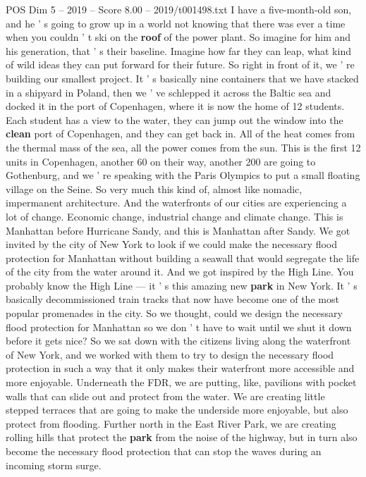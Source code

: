 \begin{textsample}{POS Dim 5 – 2019 – Score 8.00 – 2019/t001498.txt}
I have a five-month-old son, and he ' s going to grow up in a world not knowing that there was ever a time when you couldn ' t ski on the \textbf{roof} of the power plant.
So imagine for him and his generation, that ' s their baseline.
Imagine how far they can leap, what kind of wild ideas they can put forward for their future.
So right in front of it, we ' re building our smallest project.
It ' s basically nine containers that we have stacked in a shipyard in Poland, then we ' ve schlepped it across the Baltic sea and docked it in the port of Copenhagen, where it is now the home of 12 students.
Each student has a view to the water, they can jump out the window into the \textbf{clean} port of Copenhagen, and they can get back in.
All of the heat comes from the thermal mass of the sea, all the power comes from the sun.
This is the first 12 units in Copenhagen, another 60 on their way, another 200 are going to Gothenburg, and we ' re speaking with the Paris Olympics to put a small floating village on the Seine.
So very much this kind of, almost like nomadic, impermanent architecture.
And the waterfronts of our cities are experiencing a lot of change.
Economic change, industrial change and climate change.
This is Manhattan before Hurricane Sandy, and this is Manhattan after Sandy.
We got invited by the city of New York to look if we could make the necessary flood protection for Manhattan without building a seawall that would segregate the life of the city from the water around it.
And we got inspired by the High Line.
You probably know the High Line — it ' s this amazing new \textbf{park} in New York.
It ' s basically decommissioned train tracks that now have become one of the most popular promenades in the city.
So we thought, could we design the necessary flood protection for Manhattan so we don ' t have to wait until we shut it down before it gets nice?
So we sat down with the citizens living along the waterfront of New York, and we worked with them to try to design the necessary flood protection in such a way that it only makes their waterfront more accessible and more enjoyable.
Underneath the FDR, we are putting, like, pavilions with pocket walls that can slide out and protect from the water.
We are creating little stepped terraces that are going to make the underside more enjoyable, but also protect from flooding.
Further north in the East River Park, we are creating rolling hills that protect the \textbf{park} from the noise of the highway, but in turn also become the necessary flood protection that can stop the waves during an incoming storm surge.

\end{textsample}

